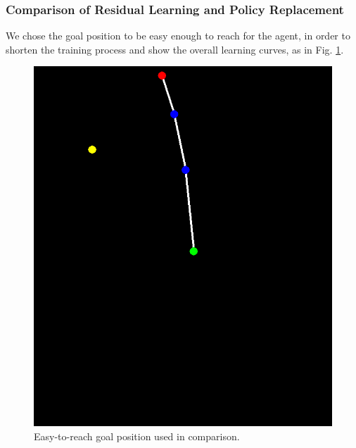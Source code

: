 \documentclass{article}
\begin{document}
\subsubsection{Comparison of Residual Learning and Policy Replacement}
We chose the goal position to be easy enough to reach for the agent, in order to shorten the training process and show the overall learning curves, as in Fig. \ref{fig:rpl1}.
\begin{figure}[htbp]
	\centering
	\includegraphics[scale=0.2]{img/goal_position.png}
	\caption{Easy-to-reach goal position used in comparison.}
	\label{fig:rpl1}
\end{figure}
\end{document}
